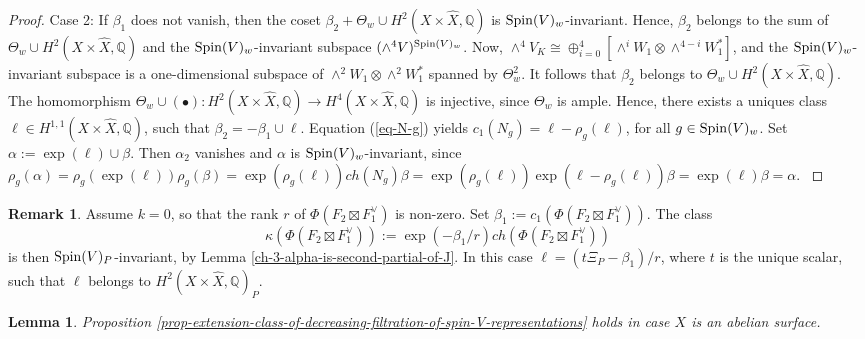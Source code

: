 \documentclass[12pt]{amsart}
\numberwithin{equation}{subsection}
\theoremstyle{plain}
\newtheorem{lem}[thm]{Lemma}
\theoremstyle{definition}
\newtheorem{rem}[thm]{Remark}
\newcommand{\CC}{{\mathbb C}}
\newcommand{\QQ}{{\mathbb Q}}
\newcommand{\Spin}{{\rm Spin}}
\newcommand{\Sym}{{\rm Sym}}
\begin{document}
\begin{proof}
{Case 2: If $\beta_1$ does not vanish, then the coset
$\beta_2+\Theta_w\cup H^2(X\times\hat{X},\QQ)$ is $\Spin(V)_w$-invariant.
Hence, $\beta_2$  belongs to the sum of $\Theta_w\cup H^2(X\times\hat{X},\QQ)$ and the $\Spin(V)_w$-invariant subspace $(\wedge^4V)^{\Spin(V)_w}$.
Now, $\wedge^4V_K\cong \oplus_{i=0}^4[\wedge^iW_1\otimes \wedge^{4-i}W_1^*]$, and the 
$\Spin(V)_w$-invariant subspace is a one-dimensional subspace of $\wedge^2W_1\otimes \wedge^2 W_1^*$ spanned by 
$\Theta_w^2$. It follows that 
$\beta_2$ belongs to $\Theta_w\cup H^2(X\times\hat{X},\QQ)$. The homomorphism
$\Theta_w\cup(\bullet): H^2(X\times\hat{X},\QQ)\rightarrow H^4(X\times\hat{X},\QQ)$ is injective, since $\Theta_w$ is ample.
Hence, there exists a uniques class $\ell\in H^{1,1}(X\times\hat{X},\QQ)$, such that 
$\beta_2=-\beta_1\cup \ell.$ Equation (\ref{eq-N-g}) yields $c_1(N_g)=\ell-\rho_g(\ell)$, for all $g\in \Spin(V)_w$.
Set $\alpha:=\exp(\ell)\cup \beta$. Then $\alpha_2$ vanishes and $\alpha$ is $\Spin(V)_w$-invariant, since
$
\rho_g(\alpha)=\rho_g(\exp(\ell))\rho_g(\beta)=\exp(\rho_g(\ell))ch(N_g)\beta=
\exp(\rho_g(\ell))\exp(\ell-\rho_g(\ell))\beta=\exp(\ell)\beta=\alpha.
$
}
\end{proof}

\begin{rem}
\label{remark-k-equal-0-case}
Assume $k=0$, so that the rank $r$ of $\Phi(F_2\boxtimes F_1^\vee)$ is non-zero. 
Set $\beta_1:=c_1(\Phi(F_2\boxtimes F_1^\vee))$. The class 
\[
\kappa(\Phi(F_2\boxtimes F_1^\vee)):=\exp(-\beta_1/r)ch(\Phi(F_2\boxtimes F_1^\vee))
\] 
is then $\Spin(V)_P$-invariant, by Lemma \ref{ch-3-alpha-is-second-partial-of-J}. In this case $\ell=(t\Xi_P-\beta_1)/r$, where $t$ is the unique scalar, such that $\ell$ belongs to $H^2(X\times\hat{X},\QQ)_P$.
\end{rem}

\begin{lem}
\label{example-conjecture-holds-for-abelian-surfaces}
Proposition \ref{prop-extension-class-of-decreasing-filtration-of-spin-V-representations} holds in  case $X$ is an abelian surface. 
\end{lem}
\end{document}
